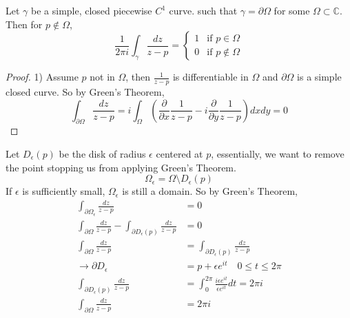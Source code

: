 \begin{example}
    Let $\gamma$ be a simple, closed piecewise $C^1$ curve. such that $\gamma = \partial \Omega$ for some $\Omega \subset \mathbb{C}$. Then for $ p \notin \Omega$,
    $$ \frac{1}{2\pi i} \int_{\gamma} \frac{dz}{z - p} = \begin{cases}
            1 & \text{if } p \in \Omega    \\
            0 & \text{if } p \notin \Omega
        \end{cases} $$
    \begin{proof}
        1) Assume $p$ not in $\Omega$, then $\frac{1}{z - p}$ is differentiable in $\Omega$ and $\partial \Omega$ is a simple closed curve. So by Green's Theorem,
        $$ \int_{\partial \Omega} \frac{dz}{z - p} = i \int_{\Omega} \left( \frac{\partial}{\partial x} \frac{1}{z - p} - i\frac{\partial}{\partial y} \frac{1}{z - p} \right) dxdy = 0 $$
    \end{proof}
    Let $D_{\epsilon}(p)$ be the disk of radius $\epsilon$ centered at $p$, essentially, we want to remove the point stopping us from applying Green's Theorem.
    $$ \Omega_{\epsilon} = \Omega \setminus D_{\epsilon}(p) $$
    If $\epsilon$ is sufficiently small, $\Omega_{\epsilon}$ is still a domain. So by Green's Theorem,
    \begin{align*} \int_{\partial \Omega_{\epsilon}} \frac{dz}{z - p}                                         & = 0                                                                    \\
               \int_{\partial \Omega} \frac{dz}{z - p} - \int_{\partial D_{\epsilon}(p)} \frac{dz}{z - p} & = 0                                                                    \\
               \int_{\partial \Omega} \frac{dz}{z - p}                                                    & = \int_{\partial D_{\epsilon}(p)} \frac{dz}{z - p}                     \\
               \rightarrow \partial D_{\epsilon}                                                          & = p + \epsilon e^{it} \quad 0 \leq t \leq 2\pi                         \\
               \int_{\partial D_{\epsilon}(p)} \frac{dz}{z - p}                                           & = \int_{0}^{2\pi} \frac{i\epsilon e^{it}}{\epsilon e^{it}} dt = 2\pi i \\
               \int_{\partial \Omega} \frac{dz}{z - p}                                                    & = 2\pi i
    \end{align*}
\end{example}
